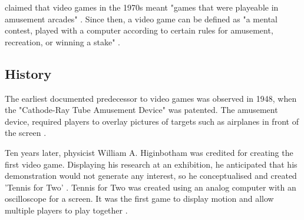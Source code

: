 \documentclass[a4paper,11.5pt]{report}
\numberwithin{figure}{section}
\numberwithin{table}{section}
\numberwithin{equation}{section}
\numberwithin{equation}{section}
\begin{document}
\citeauthor{Botturi2009} claimed that video games in the 1970s meant "games that were playeable in amusement arcades" \citep{Botturi2009}. Since then, a video game can be defined as "a mental contest, played with a computer according to certain rules for amusement, recreation, or winning a stake" \citep{Zyda2005}.


\subsection{History}


The earliest documented predecessor to video games was observed in 1948, when the "Cathode-Ray Tube Amusement Device" was patented. The amusement device, required players to overlay pictures of targets such as airplanes in front of the screen \citep{Thefirstvideogame}.

Ten years later, physicist William A. Higinbotham was credited for creating the first video game. Displaying his research at an exhibition, he anticipated that his demonstration would not generate any interest, so he conceptualised and created 'Tennis for Two' \citep{TennisForTwo}. Tennis for Two was created using an analog computer with an oscilloscope for a screen. It was the first game to display motion and allow multiple players to play together \citep{Thefirstvideogame}. 

\end{document}
